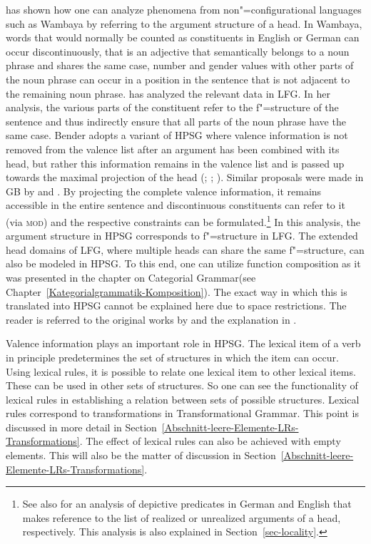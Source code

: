 \citet{Bender2008a}\label{Seite-Bender-Wambaya} has shown how one can analyze phenomena from non"=configurational languages such as Wambaya
by referring to the argument structure of a head. In Wambaya, words that would normally be counted as constituents in English or German can occur discontinuously, that
is an adjective that semantically belongs to a noun phrase and shares the same case, number and gender values with other parts of the noun
phrase can occur in a position in the sentence that is not adjacent to the remaining noun phrase. \citet{Nordlinger98a-u} has analyzed the relevant data in LFG\indexlfg. In her analysis, the various parts
of the constituent refer to the f"=structure of the sentence and thus indirectly ensure that all parts of the noun phrase have the same case.
Bender adopts a variant of HPSG where valence information is not removed from the valence list after an argument has been combined with its head, but rather
this information remains in the valence list and is passed up towards the maximal projection of the head (\citealp{Meurers99b}; \citealp{Prze99};
\citealp[Section~17.4]{MuellerLehrbuch1}). Similar proposals were made in GB by \citet[]{Higginbotham85a} and \citet{Winkler97a}. 
By projecting the complete valence information, it remains accessible in the entire sentence and discontinuous constituents can refer to it (\eg via \textsc{mod})
and the respective constraints can be formulated.\footnote{
	See also  for an analysis of depictive predicates in German and English that makes reference to the list of
	realized or unrealized arguments of a head, respectively. This analysis is also explained in Section~\ref{sec-locality}.
}  
In this analysis, the argument structure in HPSG corresponds to f"=structure in LFG. The extended head domains of LFG\indexlfg, where
multiple heads can share the same f"=structure, can also be modeled in HPSG. To this end, one can utilize function composition
as it was presented in the chapter on Categorial Grammar\indexcg (see Chapter~\ref{Kategorialgrammatik-Komposition}). The exact way in which this is
translated into HPSG cannot be explained here due to space restrictions. The reader is referred to the original works by \citet{HN94a} and the
explanation in .
	
Valence information plays an important role in HPSG. The lexical item of a verb in principle
predetermines the set of structures in which the item can occur.
Using lexical rules, it is possible to relate one lexical item to other lexical items. These can be
used in other sets of structures. So one can see the functionality of lexical rules in establishing
a relation between sets of possible structures. Lexical rules correspond to transformations in Transformational Grammar. This point is discussed in more detail in 
Section~\ref{Abschnitt-leere-Elemente-LRs-Transformations}. The effect of lexical rules can also be achieved with empty elements. This will also be
the matter of discussion in Section~\ref{Abschnitt-leere-Elemente-LRs-Transformations}.

